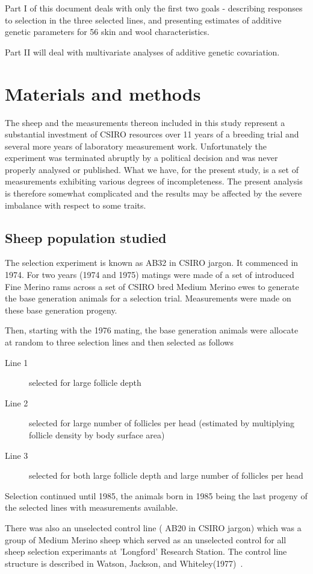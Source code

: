 \documentclass[titlepage]{article}  %
\begin{document}
Part I of this document deals with only the first two goals - describing responses to selection in the three selected lines, and presenting estimates of additive genetic parameters for 56 skin and wool characteristics.

Part II will deal with multivariate analyses of additive genetic covariation.
\section{Materials and methods}
The sheep and the measurements thereon included in this study represent a substantial investment of CSIRO resources over 11 years of a breeding trial and several more years of laboratory measurement work. Unfortunately the experiment was terminated abruptly by a political decision and was never properly analysed or published. What we have, for the present study, is a set of measurements exhibiting various degrees of incompleteness. The present analysis is therefore somewhat complicated and the results may be affected by the severe imbalance with respect to some traits.

\subsection{ Sheep population studied}
The selection experiment is known as AB32 in CSIRO jargon. It commenced in 1974. For two years (1974 and 1975) matings were made of a set of introduced Fine Merino rams across a set of CSIRO bred Medium Merino ewes to generate the base generation animals for a selection trial. Measurements were made on these base generation progeny.

Then, starting with the 1976 mating, the base generation animals were allocate at random to three selection lines and then selected as follows
\begin{description}
\item[Line 1] selected for large follicle depth
\item[Line 2] selected for large number of follicles per head (estimated by multiplying follicle density by body surface area)
\item[Line 3] selected for both large follicle depth and large number of follicles per head
\end{description}
Selection continued until 1985, the animals born in 1985 being the last progeny of the selected lines with measurements available.

There was also an unselected control line ( AB20 in CSIRO jargon) which was a group of Medium Merino sheep which served as an unselected control for all sheep selection experimants at 'Longford' Research Station. The control line structure is described in Watson, Jackson, and Whiteley(1977)~\cite{wats:77}.
\end{document}
